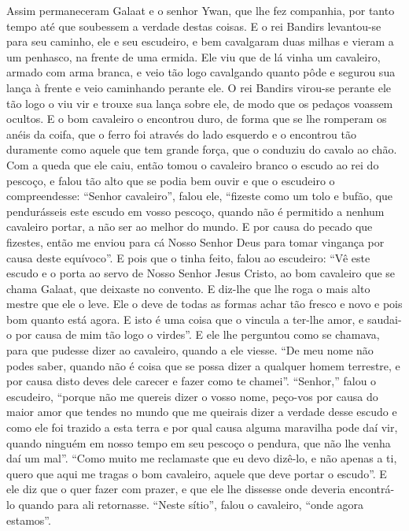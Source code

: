 Assim permaneceram Galaat e o senhor Ywan, que lhe fez companhia, por tanto
tempo até que soubessem a verdade destas coisas. E o rei Bandirs levantou-se
para seu caminho, ele e seu escudeiro, e bem cavalgaram duas milhas e vieram a
um penhasco, na frente de uma ermida. Ele viu que de lá vinha um cavaleiro,
armado com arma branca, e veio tão logo cavalgando quanto pôde e segurou sua
lança à frente e veio caminhando perante ele. O rei Bandirs virou-se perante
ele tão logo o viu vir e trouxe sua lança sobre ele, de modo que os pedaços
voassem ocultos. E o bom cavaleiro o encontrou duro, de forma que se lhe
romperam os anéis da coifa, que o ferro foi através do lado esquerdo e o
encontrou tão duramente como aquele que tem grande força, que o conduziu do
cavalo ao chão. Com a queda que ele caiu, então tomou o cavaleiro branco o
escudo ao rei do pescoço, e falou tão alto que se podia bem ouvir e que o
escudeiro o compreendesse: “Senhor cavaleiro”, falou ele, “fizeste como um tolo
e bufão, que pendurásseis este escudo em vosso pescoço, quando não é permitido
a nenhum cavaleiro portar, a não ser ao melhor do mundo. E por causa do pecado
que fizestes, então me enviou para cá Nosso Senhor Deus para tomar vingança por
causa deste equívoco”. E pois que o tinha feito, falou ao escudeiro:
“Vê este escudo e o porta ao servo de Nosso Senhor Jesus Cristo, ao bom
cavaleiro que se chama Galaat, que deixaste no convento. E diz-lhe que lhe roga
o mais alto mestre que ele o leve. Ele o deve de todas as formas achar tão
fresco e novo e pois bom quanto está agora. E isto é uma coisa que o vincula a
ter-lhe amor, e saudai-o por causa de mim tão logo o virdes”.  E ele
lhe perguntou como se chamava, para que pudesse dizer ao cavaleiro, quando a
ele viesse. “De meu nome não podes saber, quando não é coisa que se possa dizer
a qualquer homem terrestre, e por causa disto deves dele carecer e fazer como
te chamei”. “Senhor,” falou o escudeiro, “porque não me quereis dizer o
vosso nome, peço-vos por causa do maior amor que tendes no mundo que me
queirais dizer a verdade desse escudo e como ele foi trazido a esta terra e por
qual causa alguma maravilha pode daí vir, quando ninguém em nosso tempo em seu
pescoço o pendura, que não lhe venha daí um mal”. “Como muito me reclamaste que
eu devo dizê-lo, e não apenas a ti, quero que aqui me tragas o bom
cavaleiro, aquele que deve portar o escudo”. E ele diz que o quer fazer com
prazer, e que ele lhe dissesse onde deveria encontrá-lo quando para ali
retornasse. “Neste sítio”, falou o cavaleiro, “onde agora estamos”.  

